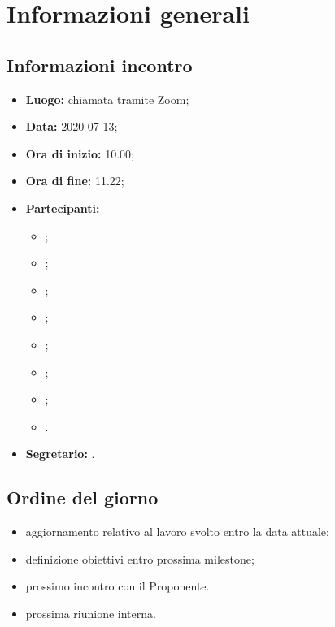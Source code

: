 \section{Informazioni generali}
\subsection{Informazioni incontro}
\begin{itemize}
	\item \textbf{Luogo:} chiamata tramite Zoom;
	\item \textbf{Data:} 2020-07-13;
	\item \textbf{Ora di inizio:} 10.00;
	\item \textbf{Ora di fine:} 11.22;
	\item \textbf{Partecipanti:}
		\begin{itemize}
			\item \VB;
			\item \LB;
			\item \NF;
			\item \EG;
			\item \FJ;
			\item \MP;
			\item \AS;
			\item \AZ.
		\end{itemize}
	\item \textbf{Segretario:} \LB.
\end{itemize}

\subsection{Ordine del giorno}
\begin{itemize}
	\item aggiornamento relativo al lavoro svolto entro la data attuale;
	\item definizione obiettivi entro prossima milestone\textit{};
	\item prossimo incontro con il Proponente.
	\item prossima riunione interna.
\end{itemize}

